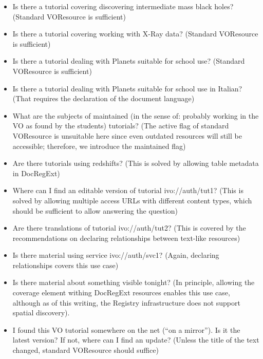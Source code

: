 \documentclass{ivoa}
\begin{document}
\begin{itemize}

\item Is there a tutorial covering discovering intermediate mass black
holes? (Standard VOResource is sufficient){}

\item Is there a tutorial covering working with X-Ray data? (Standard
VOResource is sufficient){}

\item Is there a tutorial dealing with Planets suitable for school use?
(Standard VOResource is sufficient){}

\item Is there a tutorial dealing with Planets suitable for school use in
Italian? (That requires the declaration of the document language){}

\item What are the subjects of maintained (in the sense of: probably
working in the VO as found by the students) tutorials?
(The active flag of standard VOResource is
unsuitable here since even outdated resources will still be accessible;
therefore, we introduce the maintained flag){}

\item Are there tutorials using redshifts? (This is solved by allowing
table metadata in DocRegExt){}

\item Where can I find an editable version of tutorial ivo://auth/tut1?
(This is solved by allowing multiple access URLs with different content
types, which should be sufficient to allow answering the question){}

\item Are there translations of tutorial ivo://auth/tut2? (This is covered
by the recommendations on declaring relationships between text-like
resources){}

\item Is there material using service ivo://auth/svc1? (Again, declaring
relationships covers this use case){}

\item Is there material about something visible tonight? (In principle,
allowing the coverage element withing DocRegExt resources enables this
use case, although as of this writing, the Registry infrastructure does
not support spatial discovery).

\item I found this VO tutorial somewhere on the net (``on a mirror'').  Is it
the latest version?  If not, where can I find an update? (Unless the
title of the text changed, standard VOResource should suffice){}

\end{itemize}
\end{document}
